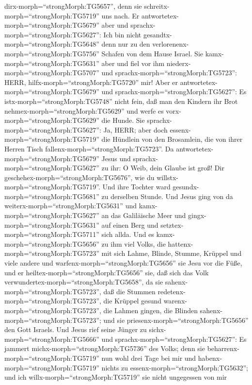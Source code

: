 dirx-morph=``strongMorph:TG5657'', denn sie
schreitx-morph=``strongMorph:TG5719'' uns nach.  Er
antwortetex-morph=``strongMorph:TG5679'' aber und
sprachx-morph=``strongMorph:TG5627'': Ich bin nicht
gesandtx-morph=``strongMorph:TG5648'' denn nur zu den
verlorenenx-morph=``strongMorph:TG5756'' Schafen von dem Hause Israel.
 Sie kamx-morph=``strongMorph:TG5631'' aber und fiel vor
ihm niederx-morph=``strongMorph:TG5707'' und
sprachx-morph=``strongMorph:TG5723'': HERR,
hilfx-morph=``strongMorph:TG5720'' mir!  Aber er
antwortetex-morph=``strongMorph:TG5679'' und
sprachx-morph=``strongMorph:TG5627'': Es
istx-morph=``strongMorph:TG5748'' nicht fein, daß man den Kindern ihr
Brot nehmex-morph=``strongMorph:TG5629'' und werfe es
vorx-morph=``strongMorph:TG5629'' die Hunde.  Sie
sprachx-morph=``strongMorph:TG5627'': Ja, HERR; aber doch
essenx-morph=``strongMorph:TG5719'' die Hündlein von den Brosamlein, die
von ihrer Herren Tisch fallenx-morph=``strongMorph:TG5723''.
 Da antwortetex-morph=``strongMorph:TG5679'' Jesus und
sprachx-morph=``strongMorph:TG5627'' zu ihr: O Weib, dein Glaube ist
groß! Dir geschehex-morph=``strongMorph:TG5676'', wie du
willstx-morph=``strongMorph:TG5719''. Und ihre Tochter ward
gesundx-morph=``strongMorph:TG5681'' zu derselben Stunde. 
Und Jesus ging von da weiterx-morph=``strongMorph:TG5631'' und
kamx-morph=``strongMorph:TG5627'' an das Galiläische Meer und
gingx-morph=``strongMorph:TG5631'' auf einen Berg und
setztex-morph=``strongMorph:TG5711'' sich allda.  Und es
kamx-morph=``strongMorph:TG5656'' zu ihm viel Volks, die
hattenx-morph=``strongMorph:TG5723'' mit sich Lahme, Blinde, Stumme,
Krüppel und viele andere und warfenx-morph=``strongMorph:TG5656'' sie
Jesu vor die Füße, und er heiltex-morph=``strongMorph:TG5656'' sie,
 daß sich das Volk
verwundertex-morph=``strongMorph:TG5658'', da sie
sahenx-morph=``strongMorph:TG5723'', daß die Stummen
redetenx-morph=``strongMorph:TG5723'', die Krüppel gesund
warenx-morph=``strongMorph:TG5723'', die Lahmen gingen, die Blinden
sahenx-morph=``strongMorph:TG5723''; und sie
priesenx-morph=``strongMorph:TG5656'' den Gott Israels. 
Und Jesus rief seine Jünger zu sichx-morph=``strongMorph:TG5666'' und
sprachx-morph=``strongMorph:TG5627'': Es jammert
michx-morph=``strongMorph:TG5736'' des Volks; denn sie
beharrenx-morph=``strongMorph:TG5719'' nun wohl drei Tage bei mir und
habenx-morph=``strongMorph:TG5719'' nichts zu
essenx-morph=``strongMorph:TG5632''; und ich
willx-morph=``strongMorph:TG5719'' sie nicht ungegessen von mir
